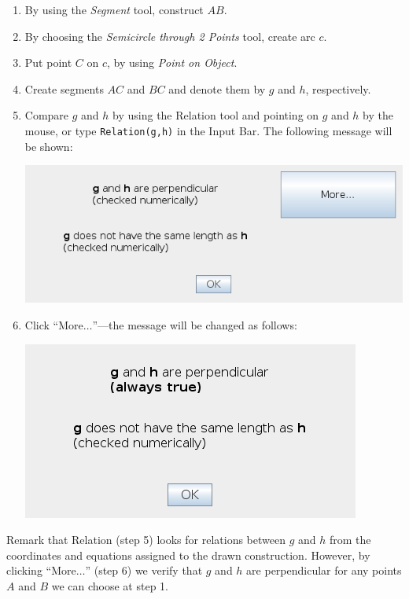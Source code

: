 \documentclass{article}
\begin{document}
\begin{enumerate}
    \item By using the \textit{Segment} tool, construct $AB$.
    \item By choosing the \textit{Semicircle through 2 Points} tool, create arc $c$.
    \item Put point $C$ on $c$, by using \textit{Point on Object}.
    \item Create segments $AC$ and $BC$ and denote them by $g$ and $h$, respectively.
    \item Compare $g$ and $h$ by using the Relation tool and pointing on $g$ and $h$ by the mouse, or type \texttt{Relation(g,h)} in the Input Bar. The following message will be shown:
    \begin{center}
    \includegraphics[scale=0.5]{Relation-example-Relation1}
    \end{center}
    \item Click ``More$\ldots$''---the message will be changed as follows:
    \begin{center}
    \includegraphics[scale=0.5]{Relation-example-Relation2}
    \end{center}
    
\end{enumerate}

Remark that Relation (step 5) looks for relations between $g$ and $h$ from the coordinates and equations assigned to the drawn construction. However, by clicking ``More$\ldots$'' (step 6) we verify that $g$ and $h$ are perpendicular for any points $A$ and $B$ we can choose at step 1.
\end{document}
